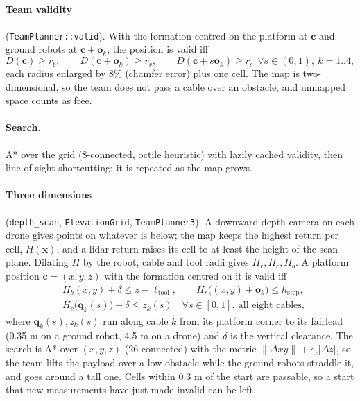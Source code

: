 \documentclass[11pt,a4paper]{article}
\begin{document}
\paragraph{Team validity} (\texttt{TeamPlanner::valid}). With the formation centred on the platform at
$\bm c$ and ground robots at $\bm c+\bm o_k$, the position is valid iff
\begin{equation}
 D(\bm c)\ge r_b,\qquad D(\bm c+\bm o_k)\ge r_r,\qquad D(\bm c+s\bm o_k)\ge r_c\ \ \forall s\in(0,1),\ k=1..4,
\end{equation}
each radius enlarged by 8\% (chamfer error) plus one cell. The map is two-dimensional, so the team does not pass a
cable over an obstacle, and unmapped space counts as free.
\paragraph{Search.} A* over the grid (8-connected, octile heuristic) with lazily cached validity, then
line-of-sight shortcutting; it is repeated as the map grows.

\paragraph{Three dimensions} (\texttt{depth\_scan}, \texttt{ElevationGrid}, \texttt{TeamPlanner3}). A downward
depth camera on each drone gives points on whatever is below; the map keeps the highest return per cell,
$H(\bm x)$, and a lidar return raises its cell to at least the height of the scan plane. Dilating $H$ by the robot,
cable and tool radii gives $H_r,H_c,H_b$. A platform position $\bm c=(x,y,z)$ with the formation centred on it is
valid iff
\begin{align}
 &H_b(x,y)+\delta\le z-\ell_{\mathrm{tool}}, \qquad H_r\bigl((x,y)+\bm o_k\bigr)\le h_{\mathrm{step}},\\
 &H_c\bigl(\bm q_k(s)\bigr)+\delta\le z_k(s)\quad\forall s\in[0,1],\ \text{all eight cables},
\end{align}
where $\bm q_k(s),z_k(s)$ run along cable $k$ from its platform corner to its fairlead (0.35 m on a ground robot,
4.5 m on a drone) and $\delta$ is the vertical clearance. The search is A* over $(x,y,z)$ (26-connected) with the
metric $\|\Delta xy\|+c_z|\Delta z|$, so the team lifts the payload over a low obstacle while the ground robots
straddle it, and goes around a tall one. Cells within 0.3 m of the start are passable, so a start that new
measurements have just made invalid can be left.
\end{document}
